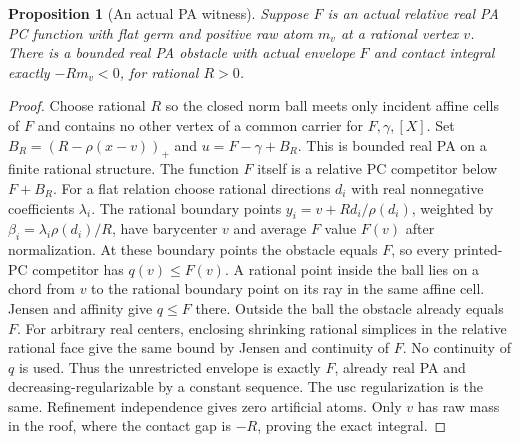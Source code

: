 \documentclass[11pt]{article}
\newtheorem{proposition}[theorem]{Proposition}
\begin{document}
\begin{proposition}[An actual PA witness]\label{roof}
Suppose $F$ is an actual relative real PA PC function with flat
germ and positive raw atom $m_v$ at a rational vertex $v$.
There is a bounded real PA obstacle with actual envelope $F$
and contact integral exactly $-Rm_v<0$, for rational $R>0$.
\end{proposition}
\begin{proof}
Choose rational $R$ so the closed norm ball meets only incident
affine cells of $F$ and contains no other vertex of a common
carrier for $F,\gamma,[X]$. Set
$B_R=(R-\rho(x-v))_+$ and $u=F-\gamma+B_R$.
This is bounded real PA on a finite rational structure. The
function $F$ itself is a relative PC competitor below $F+B_R$.
For a flat relation choose rational directions $d_i$ with real
nonnegative coefficients $\lambda_i$. The rational boundary
points $y_i=v+R d_i/\rho(d_i)$, weighted by
$\beta_i=\lambda_i\rho(d_i)/R$, have barycenter $v$ and average
$F$ value $F(v)$ after normalization. At these boundary points
the obstacle equals $F$, so every printed-PC competitor has
$q(v)\leq F(v)$. A rational point inside the ball lies on a
chord from $v$ to the rational boundary point on its ray in
the same affine cell. Jensen and affinity give $q\leq F$
there. Outside the ball the obstacle already equals $F$.
For arbitrary real centers, enclosing shrinking rational
simplices in the relative rational face give the same bound
by Jensen and continuity of $F$. No continuity of $q$ is used.
Thus the unrestricted envelope is exactly $F$, already real
PA and decreasing-regularizable by a constant sequence. The
usc regularization is the same. Refinement independence gives
zero artificial atoms. Only $v$ has raw mass in the roof, where
the contact gap is $-R$, proving the exact integral.
\end{proof}
\end{document}
